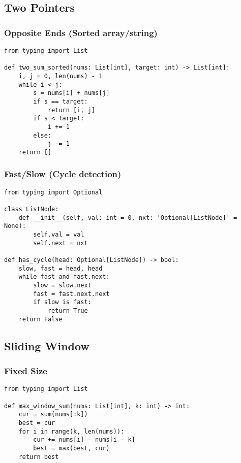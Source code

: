 \documentclass[11pt]{article}
\begin{document}
\subsection{Two Pointers}
\subsubsection*{Opposite Ends (Sorted array/string)}
\begin{lstlisting}[style=py,caption={Two pointers from both ends}]
from typing import List

def two_sum_sorted(nums: List[int], target: int) -> List[int]:
    i, j = 0, len(nums) - 1
    while i < j:
        s = nums[i] + nums[j]
        if s == target:
            return [i, j]
        if s < target:
            i += 1
        else:
            j -= 1
    return []
\end{lstlisting}

\subsubsection*{Fast/Slow (Cycle detection)}
\begin{lstlisting}[style=py,caption={Floyd's Tortoise and Hare}]
from typing import Optional

class ListNode:
    def __init__(self, val: int = 0, nxt: 'Optional[ListNode]' = None):
        self.val = val
        self.next = nxt

def has_cycle(head: Optional[ListNode]) -> bool:
    slow, fast = head, head
    while fast and fast.next:
        slow = slow.next
        fast = fast.next.next
        if slow is fast:
            return True
    return False
\end{lstlisting}

\subsection{Sliding Window}
\subsubsection*{Fixed Size}
\begin{lstlisting}[style=py,caption={Max sum over a window of size k}]
from typing import List

def max_window_sum(nums: List[int], k: int) -> int:
    cur = sum(nums[:k])
    best = cur
    for i in range(k, len(nums)):
        cur += nums[i] - nums[i - k]
        best = max(best, cur)
    return best
\end{lstlisting}
\end{document}
